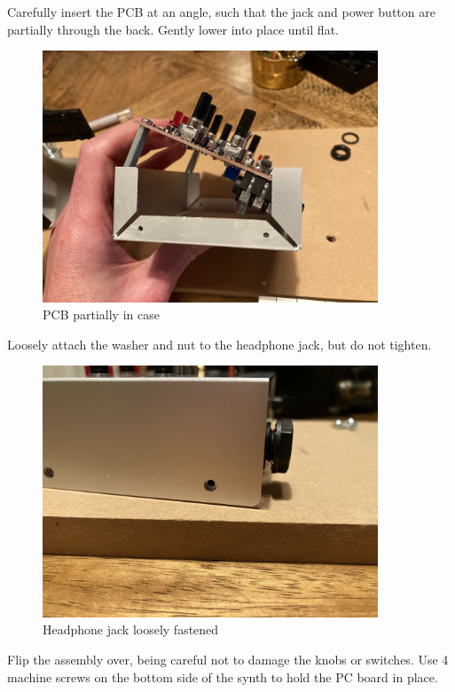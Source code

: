 \documentclass{scrartcl}
\begin{document}
Carefully insert the PCB at an angle, such that the jack and power button are partially through the back. Gently lower into place until flat.

\begin{figure}[!htbp]
    \begin{center}
        \includegraphics[width=100mm]{assets/case-insert.jpg}
        \caption{PCB partially in case}
    \end{center}
\end{figure}

Loosely attach the washer and nut to the headphone jack, but do not tighten.

\begin{figure}[!htbp]
    \begin{center}
        \includegraphics[width=100mm]{assets/case-jack.jpg}
        \caption{Headphone jack loosely fastened}
    \end{center}
\end{figure}

\pagebreak

Flip the assembly over, being careful not to damage the knobs or switches. Use 4 machine screws on the bottom side of the synth to hold the PC board in place.
\end{document}

